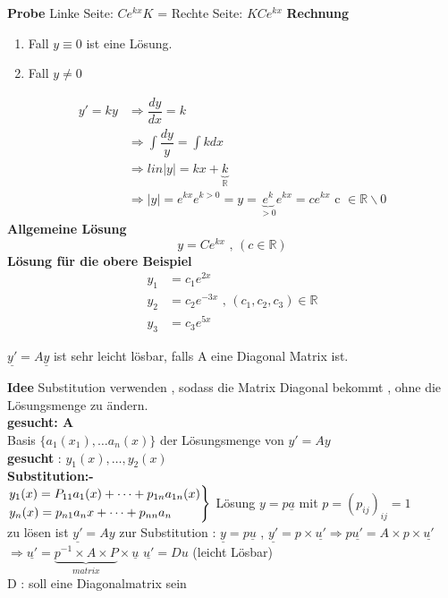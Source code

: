 \textbf{Probe}\newline
Linke Seite: $Ce^{kx}K$ = Rechte Seite: $K Ce^{kx}$\newline
\textbf{Rechnung}
\begin{enumerate}
\item Fall $y \equiv 0$ ist eine Lösung.
\item Fall $y \neq 0$
\end{enumerate}
\begin{align*}
y'=ky &\Rightarrow \dfrac{dy}{dx}=k\\
      &\Rightarrow \int\dfrac{dy}{y}= \int k dx\\
      &\Rightarrow lin|y| = kx + \underbrace{k}_{\mathbb{R}}\\
      &\Rightarrow |y|=e^{kx}e^{k > 0} = y = \underbrace{e^{k}}_{>0}e^{kx}=ce^{kx} \text{ c } \in \mathbb{R} \backslash 0
\end{align*}
\textbf{Allgemeine Lösung}\\
\[ y = Ce^{kx} \text{ , } (c \in \mathbb{R}) \]
\textbf{Lösung für die obere Beispiel }
\begin{align*}
y_1 &= c_1 e^{2x}\\
y_2 &= c_2 e^{-3x} \text{ , }(c_1 , c_2 , c_3) \in \mathbb{R} \\
y_3 &= c_3 e^{5x}
\end{align*}
\begin{remark}
$\underline{y'} = A \underline{y} $ ist sehr leicht lösbar, falls A eine Diagonal Matrix ist. 
\end{remark}
\textbf{Idee} Substitution verwenden , sodass die Matrix Diagonal bekommt , ohne die Lösungsmenge zu ändern.\\
 \textbf{gesucht: A}\\
Basis $ \{ a_1(x_1) , \dots a_n(x) \} $ der Lösungsmenge von $y'= Ay$\\
\textbf{gesucht} : $y_1(x) , \dots , y_2(x)$\\
\textbf{Substitution:-} \\
$\begin{rcases}
y_1(x) = P_{11} a_1(x) + \dots + p_{1n} a_{1n}(x) \\
	y_n(x)=p_{n1} a_n{x} + \dots + p_{nn}a_n\\	 
	\end{rcases}$ Lösung $ y = p \underline{a} $ mit $ p = (p_{ij})_{ij}=1 $\\
zu lösen ist $\underline{y'} = Ay $ zur Substitution : $\underline{y} = p \underline{u}$ , 
$\underline{y'}= p \times \underline{u'} \Rightarrow p \underline{u'} = A \times p \times \underline{u'}$\\
$\Rightarrow \underline{u'} = 
\underbrace{p^{-1} \times A \times P}_{matrix} \times \underline{u} $
$\underline{u'} = D u$ (leicht Lösbar) \\
D : soll eine Diagonalmatrix sein
